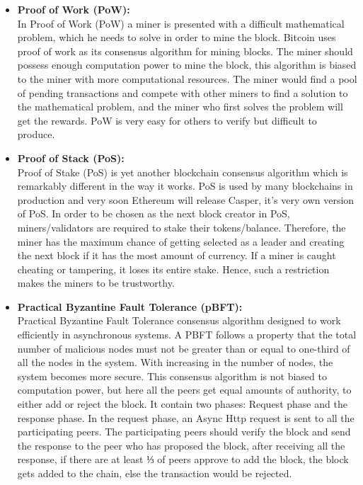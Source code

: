				\begin{itemize}
					\item \textbf{Proof of Work (PoW):} \\
					In Proof of Work (PoW) a miner is presented with a difficult mathematical problem, which he needs to solve in order to mine the block. Bitcoin uses proof of work as its consensus algorithm for mining blocks. The miner should possess enough computation power to mine the block, this algorithm is biased to the miner with more computational resources. The miner would find a pool of pending transactions and compete with other miners to find a solution to the mathematical problem, and the miner who first solves the problem will get the rewards. PoW is very easy for others to verify but difficult to produce. 
					\item \textbf{Proof of Stack (PoS):} \\
					Proof of Stake (PoS) is yet another blockchain consensus algorithm which is remarkably different in the way it works. PoS is used by many blockchains in production and very soon Ethereum will release Casper, it’s very own version of PoS. In order to be chosen as the next block creator in PoS, miners/validators are required to stake their tokens/balance. Therefore, the miner has the maximum chance of getting selected as a leader and creating the next block if it has the most amount of currency. If a miner is caught cheating or tampering, it loses its entire stake. Hence, such a restriction makes the miners to be trustworthy. 
					\item \textbf{Practical Byzantine Fault Tolerance (pBFT):} \\
					Practical Byzantine Fault Tolerance consensus algorithm designed to work efficiently in asynchronous systems. A PBFT follows a property that the total number of malicious nodes must not be greater than or equal to one-third of all the nodes in the system. With increasing in the number of nodes, the system becomes more secure. This consensus algorithm is not biased to computation power, but here all the peers get equal amounts of authority, to either add or reject the block. It contain two phases: Request phase and the response phase. In the request phase, an Async Http request is sent to all the participating peers. The participating peers should verify the block and send the response to the peer who has proposed the block, after receiving all the response, if there are at least $⅓$ of peers approve to add the block, the block gets added to the chain, else the transaction would be rejected. 

\end{itemize}
